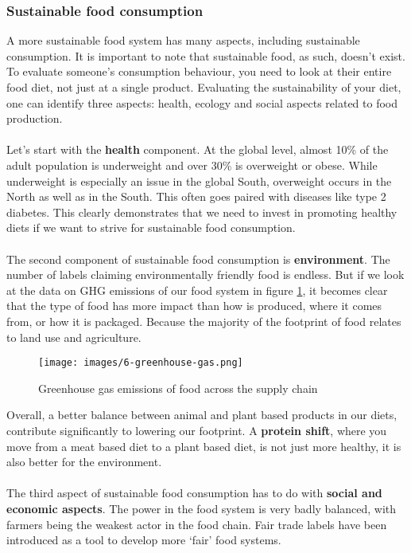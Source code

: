 \documentclass[../summary.tex]{subfiles}
\begin{document}
\newpage
\subsubsection{Sustainable food consumption}

A more sustainable food system has many aspects, including sustainable consumption. It is important to note that sustainable food, as such, doesn't exist. To evaluate someone's consumption behaviour, you need to look at their entire food diet, not just at a single product. Evaluating the sustainability of your diet, one can identify three aspects: health, ecology and social aspects related to food production.
\\\\
Let's start with the \textbf{health} component. At the global level, almost 10\% of the adult population is underweight and over 30\% is overweight or obese. While underweight is especially an issue in the global South, overweight occurs in the North as well as in the South. This often goes paired with diseases like type 2 diabetes. This clearly demonstrates that we need to invest in promoting healthy diets if we want to strive for sustainable food consumption.
\\\\
The second component of sustainable food consumption is \textbf{environment}. The number of labels claiming environmentally friendly food is endless. But if we look at the data on GHG emissions of our food system in figure \ref{fig:greenhouse-gas}, it becomes clear that the type of food has more impact than how is produced, where it comes from, or how it is packaged. Because the majority of the footprint of food relates to land use and agriculture.

\begin{figure}[htbp]
	\centering
	\texttt{[image: images/6-greenhouse-gas.png]}
	\caption{Greenhouse gas emissions of food across the supply chain}
	\label{fig:greenhouse-gas}
\end{figure}

Overall, a better balance between animal and plant based products in our diets, contribute significantly to lowering our footprint. A \textbf{protein shift}, where you move from a meat based diet to a plant based diet, is not just more healthy, it is also better for the environment.
\\\\
The third aspect of sustainable food consumption has to do with \textbf{social and economic aspects}. The power in the food system is very badly balanced, with farmers being the weakest actor in the food chain. Fair trade labels have been introduced as a tool to develop more `fair' food systems.
\end{document}
